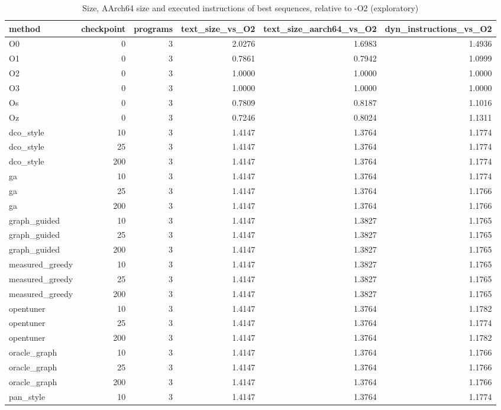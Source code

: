 \begin{table}[t]
\centering
\caption{Size, AArch64 size and executed instructions of best sequences, relative to -O2 (exploratory)}
\label{tab:v3-1-measured-vs-O2}
\begin{tabular}{lrrrrr}
\toprule
method & checkpoint & programs & text\_size\_vs\_O2 & text\_size\_aarch64\_vs\_O2 & dyn\_instructions\_vs\_O2 \\
\midrule
O0 & 0 & 3 & 2.0276 & 1.6983 & 1.4936 \\
O1 & 0 & 3 & 0.7861 & 0.7942 & 1.0999 \\
O2 & 0 & 3 & 1.0000 & 1.0000 & 1.0000 \\
O3 & 0 & 3 & 1.0000 & 1.0000 & 1.0000 \\
Os & 0 & 3 & 0.7809 & 0.8187 & 1.1016 \\
Oz & 0 & 3 & 0.7246 & 0.8024 & 1.1311 \\
dco\_style & 10 & 3 & 1.4147 & 1.3764 & 1.1774 \\
dco\_style & 25 & 3 & 1.4147 & 1.3764 & 1.1774 \\
dco\_style & 200 & 3 & 1.4147 & 1.3764 & 1.1774 \\
ga & 10 & 3 & 1.4147 & 1.3764 & 1.1774 \\
ga & 25 & 3 & 1.4147 & 1.3764 & 1.1766 \\
ga & 200 & 3 & 1.4147 & 1.3764 & 1.1766 \\
graph\_guided & 10 & 3 & 1.4147 & 1.3827 & 1.1765 \\
graph\_guided & 25 & 3 & 1.4147 & 1.3827 & 1.1765 \\
graph\_guided & 200 & 3 & 1.4147 & 1.3827 & 1.1765 \\
measured\_greedy & 10 & 3 & 1.4147 & 1.3827 & 1.1765 \\
measured\_greedy & 25 & 3 & 1.4147 & 1.3827 & 1.1765 \\
measured\_greedy & 200 & 3 & 1.4147 & 1.3827 & 1.1765 \\
opentuner & 10 & 3 & 1.4147 & 1.3764 & 1.1782 \\
opentuner & 25 & 3 & 1.4147 & 1.3764 & 1.1774 \\
opentuner & 200 & 3 & 1.4147 & 1.3764 & 1.1782 \\
oracle\_graph & 10 & 3 & 1.4147 & 1.3764 & 1.1766 \\
oracle\_graph & 25 & 3 & 1.4147 & 1.3764 & 1.1766 \\
oracle\_graph & 200 & 3 & 1.4147 & 1.3764 & 1.1766 \\
pan\_style & 10 & 3 & 1.4147 & 1.3764 & 1.1774 \\

\end{tabular}
\end{table}
